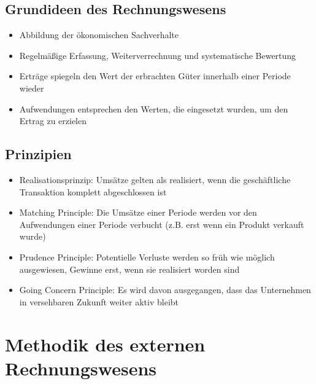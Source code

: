 \subsection{Grundideen des Rechnungswesens}
\begin{itemize}
	\item Abbildung der ökonomischen Sachverhalte
	\item Regelmäßige Erfassung, Weiterverrechnung und systematische Bewertung
	\item Erträge spiegeln den Wert der erbrachten Güter innerhalb einer Periode wieder
	\item Aufwendungen entsprechen den Werten, die eingesetzt wurden, um den Ertrag zu erzielen
\end{itemize}


\subsection{Prinzipien}
\begin{itemize}
	\item Realisationsprinzip: Umsätze gelten als realisiert, wenn die geschäftliche Transaktion komplett abgeschlossen ist
	\item Matching Principle: Die Umsätze einer Periode werden vor den Aufwendungen einer Periode verbucht (z.B. erst wenn ein Produkt verkauft wurde)
	\item Prudence Principle: Potentielle Verluste werden so früh wie möglich ausgewiesen, Gewinne erst, wenn sie realisiert worden sind
	\item Going Concern Principle: Es wird davon ausgegangen, dass das Unternehmen in versehbaren Zukunft weiter aktiv bleibt
\end{itemize}



\section{Methodik des externen Rechnungswesens}

